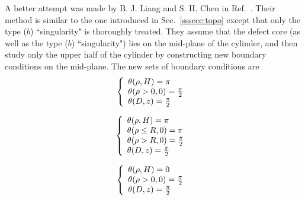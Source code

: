 \documentclass[nottitlepage]{article}
\begin{document}



   A better attempt was made by B. J. Liang and S. H. Chen in Ref.~\cite{liang}. Their method is similar to the one introduced in Sec.~\ref{sssecc:topo} except that only the type ($b$) ``singularity" is thoroughly treated. They assume that the defect core (as well as the type ($b$) ``singularity") lies on the mid-plane of the cylinder, and then study only the upper half of the cylinder by constructing new boundary conditions on the mid-plane. %
   The new sets of boundary conditions are
    \begin{equation}\label{eq:theta222}
              \left\{
              \begin{array}{l l l l}
              \theta(\rho,H)=\pi\\
              \theta(\rho>0,0)=\frac{\pi}{2} \\
              \theta(D,z)=\frac{\pi}{2}\\
              \end{array}
              \right.\
              \end{equation}
              
         \begin{equation}\label{eq:theta22222}
                      \left\{
                      \begin{array}{l l l l}
           
                      \theta(\rho,H)=\pi\\
                      \theta(\rho\le R,0)=\pi \\
                      \theta(\rho>R,0)=\frac{\pi}{2} \\
                      \theta(D,z)=\frac{\pi}{2}\\
                      \end{array}
                      \right.\
                      \end{equation}
   
              \begin{equation}\label{eq:theta3333}
                    \left\{
                    \begin{array}{l l l l}
   
                    \theta(\rho,H)=0\\
                    \theta(\rho>0,0)=\frac{\pi}{2} \\
                    \theta(D,z)=\frac{\pi}{2}\\
                    \end{array}
                    \right.\
                    \end{equation}
   
\end{document}
